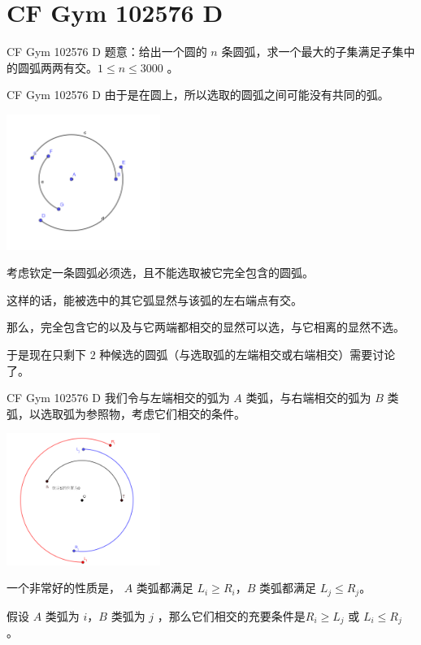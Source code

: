 \documentclass[9pt]{beamer}
\begin{document}
  \section{CF Gym 102576 D}
  \begin{frame}{CF Gym 102576 D}
     题意：给出一个圆的 $n$ 条圆弧，求一个最大的子集满足子集中的圆弧两两有交。$1\le n \le 3000$ 。
  \end{frame}
  \begin{frame}{CF Gym 102576 D}
     由于是在圆上，所以选取的圆弧之间可能没有共同的弧。
    \begin{center}
      \includegraphics[width=5cm]{photo1.png}
    \end{center}

     考虑钦定一条圆弧必须选，且不能选取被它完全包含的圆弧。

     这样的话，能被选中的其它弧显然与该弧的左右端点有交。

     那么，完全包含它的以及与它两端都相交的显然可以选，与它相离的显然不选。

     于是现在只剩下 $2$ 种候选的圆弧（与选取弧的左端相交或右端相交）需要讨论了。
  \end{frame}
  \begin{frame}{CF Gym 102576 D}
     我们令与左端相交的弧为 $A$ 类弧，与右端相交的弧为 $B$ 类弧，以选取弧为参照物，考虑它们相交的条件。
    \begin{center}
      \includegraphics[width=5cm]{photo2.png}
    \end{center}

     一个非常好的性质是， $A$ 类弧都满足 $L_i\ge R_i$，$B$ 类弧都满足 $L_j\le R_j$。

     假设 $A$ 类弧为 $i$，$B$ 类弧为 $j$ ，那么它们相交的充要条件是$ R_i\ge L_j$ 或 $L_i\le R_j$ 。
  \end{frame}
\end{document}
